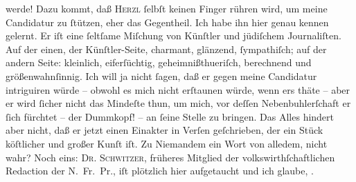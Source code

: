                werde! Dazu kommt, daß \textsc{Herzl}{ }ſelbſt keinen Finger rühren wird, um meine Candidatur zu{ }ſtützen, eher das
               Gegentheil. Ich habe ihn hier genau kennen gelernt. Er iſt {\pb}eine{ }ſeltſame Miſchung von Künſtler und jüdiſchem
               Journaliſten. Auf der einen, der Künſtler-Seite, charmant, glänzend,{ }ſympathiſch; auf
               der andern Seite: kleinlich, eiferſüchtig,  geheimnißthueriſch, berechnend und größenwahnſinnig. Ich will ja nicht{ }ſagen,
               daß er gegen meine Candidatur intriguiren würde – obwohl es mich nicht erſtaunen
               würde, wenn ers thäte – aber er wird{ }ſicher nicht das Mindeſte thun, um mich, vor
               deſſen Nebenbuhlerſchaft er{ }ſich fürchtet – der Dummkopf! – an{ }ſeine Stelle zu bringen. Das Alles hindert
               aber {\pb}nicht, daß er jetzt einen Einakter in Verſen geſchrieben, der ein Stück
               köſtlicher und großer Kunſt iſt. Zu Niemandem ein Wort von alledem, nicht wahr? Noch
               eins: \textsc{Dr. Schwitzer}, früheres Mitglied der
               volkswirthſchaftlichen Redaction der N. Fr. Pr.,
               iſt plötzlich hier aufgetaucht
               und ich glaube, \label{K_L02619-5v}\label{K_L02619-5}.\pend
           
